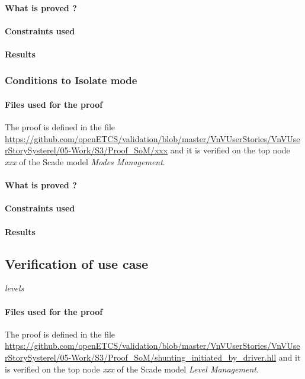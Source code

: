\documentclass{article}
\begin{document}
\paragraph{What is proved ?}


\paragraph{Constraints used}


\paragraph{Results}

\subsubsection{Conditions to Isolate mode}


\paragraph{Files used for the proof} The proof is defined in the file \url{https://github.com/openETCS/validation/blob/master/VnVUserStories/VnVUserStorySysterel/05-Work/S3/Proof_SoM/xxx} and it is verified on the top node \emph{xxx} of the Scade model \emph{Modes Management}.


\paragraph{What is proved ?}


\paragraph{Constraints used}


\paragraph{Results}

\subsection{Verification of use case}

\emph{levels}


\paragraph{Files used for the proof} The proof is defined in the file \url{https://github.com/openETCS/validation/blob/master/VnVUserStories/VnVUserStorySysterel/05-Work/S3/Proof_SoM/shunting_initiated_by_driver.hll} and it is verified on the top node \emph{xxx} of the Scade model \emph{Level Management}.
\end{document}
